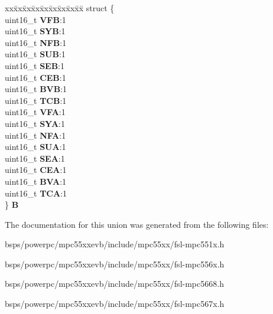 \begin{DoxyCompactItemize}
\begin{tabbing}
\end{tabbing}\item 
\mbox{\label{unionuSSR_a4816f104ac2a7018161fa60eabfbebfa}} 
\begin{tabbing}
xx\=xx\=xx\=xx\=xx\=xx\=xx\=xx\=xx\=\kill
struct \{\\
\>uint16\_t {\bfseries VFB}:1\\
\>uint16\_t {\bfseries SYB}:1\\
\>uint16\_t {\bfseries NFB}:1\\
\>uint16\_t {\bfseries SUB}:1\\
\>uint16\_t {\bfseries SEB}:1\\
\>uint16\_t {\bfseries CEB}:1\\
\>uint16\_t {\bfseries BVB}:1\\
\>uint16\_t {\bfseries TCB}:1\\
\>uint16\_t {\bfseries VFA}:1\\
\>uint16\_t {\bfseries SYA}:1\\
\>uint16\_t {\bfseries NFA}:1\\
\>uint16\_t {\bfseries SUA}:1\\
\>uint16\_t {\bfseries SEA}:1\\
\>uint16\_t {\bfseries CEA}:1\\
\>uint16\_t {\bfseries BVA}:1\\
\>uint16\_t {\bfseries TCA}:1\\
\} {\bfseries B}\\

\end{tabbing}\end{DoxyCompactItemize}


The documentation for this union was generated from the following files\+:\begin{DoxyCompactItemize}
\item 
bsps/powerpc/mpc55xxevb/include/mpc55xx/fsl-\/mpc551x.\+h\item 
bsps/powerpc/mpc55xxevb/include/mpc55xx/fsl-\/mpc556x.\+h\item 
bsps/powerpc/mpc55xxevb/include/mpc55xx/fsl-\/mpc5668.\+h\item 
bsps/powerpc/mpc55xxevb/include/mpc55xx/fsl-\/mpc567x.\+h\end{DoxyCompactItemize}
